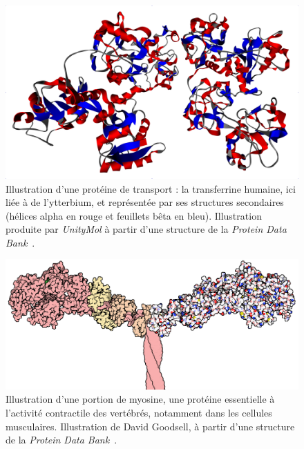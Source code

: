 	\begin{figure}[H]
		\centering
		\includegraphics[width=\textwidth]{figures/ch1/transferrin}
		\caption[Transferrine.]{Illustration d'une protéine de transport : la transferrine humaine, ici liée à de l'ytterbium, et représentée par ses structures secondaires (hélices alpha en rouge et feuillets bêta en bleu). Illustration produite par \emph{UnityMol} à partir d'une structure de la \emph{Protein Data Bank}~\cite{wang2015anion}.}
		\label{fig:transferrin}
	\end{figure}
	
	\begin{figure}[H]
		\centering
		\includegraphics[width=\textwidth]{figures/ch1/myosin}
		\caption[Myosine.]{Illustration d'une portion de myosine, une protéine essentielle à l'activité contractile des vertébrés, notamment dans les cellules musculaires. Illustration de David Goodsell, à partir d'une structure de la \emph{Protein Data Bank}~\cite{houdusse1999atomic}.}
		\label{fig:myosin}
	\end{figure}
	
